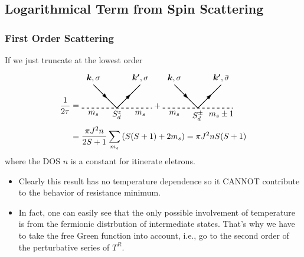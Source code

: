 \documentclass[10pt,aspectratio=43,xcolor=x11names]{beamer}%
\begin{document}
	\subsection{Logarithmical Term from Spin Scattering}
		\begin{frame}\frametitle{First Order Scattering}
			If we just truncate at the lowest order
			\begin{align*}
				\dfrac{1}{2\tau}&=\begin{tikzpicture}[baseline]
					\draw[thick,dashed] (-1.5,0)--(1.5,0);
					\draw[thick] (-1,1)--(0,0)--(1,1);
					\node[below] at (1,0) {$m_s$};
					\node[below] at (-1,0) {$m_s$};
					\node[below] at (0,0) {$S_d^z$};
					\node[rotate=-45] at (-0.5,0.5) {\arrow};
					\node[above] at (-1,1) {$\bm{k},\sigma$};
					\node[above] at (1,1) {$\bm{k'},\sigma$};
					\node[rotate=45] at (0.5,0.5) {\arrow};
				\end{tikzpicture}+
				\begin{tikzpicture}[baseline]
					\draw[thick,dashed] (-1.5,0)--(1.5,0);
					\draw[thick] (-1,1)--(0,0)--(1,1);
					\node[below] at (1,0) {$m_s\pm1$};
					\node[below] at (-1,0) {$m_s$};
					\node[below] at (0,0) {$S_d^\pm$};
					\node[rotate=-45] at (-0.5,0.5) {\arrow};
					\node[above] at (-1,1) {$\bm{k},\sigma$};
					\node[above] at (1,1) {$\bm{k'},\bar{\sigma}$};
					\node[rotate=45] at (0.5,0.5) {\arrow};
				\end{tikzpicture}\nonumber\\
				&=\dfrac{\pi J^2 n}{2S+1}\sum_{m_s}\left(S(S+1)+2m_s\right)=\pi J^2 nS(S+1)
			\end{align*}
			where the DOS $n$ is a constant for itinerate eletrons.
			\pause
			\begin{itemize}
				\item Clearly this result has no temperature dependence so it CANNOT contribute to the behavior of resistance minimum.
				\item In fact, one can easily see that {\color{blue}the only possible involvement of temperature is from the fermionic distrbution of intermediate states}. That's why we have to take the free Green function into account, i.e., go to the second order of the perturbative series of $T^R$.
			\end{itemize}
		\end{frame}
\end{document}
